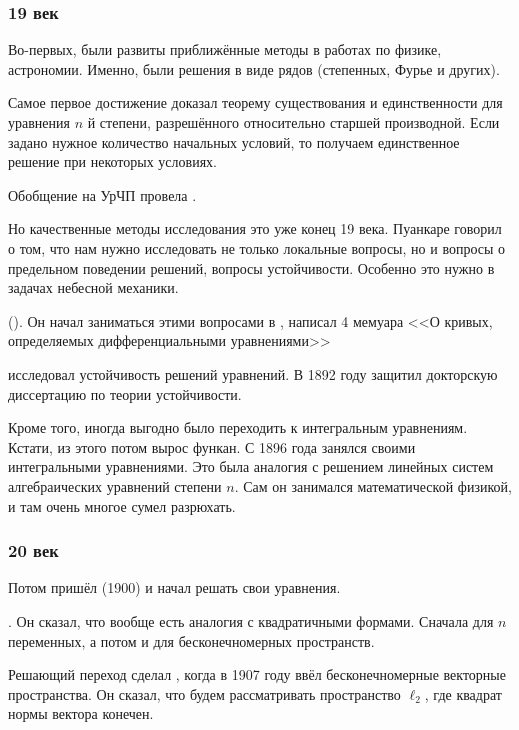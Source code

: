 \documentclass[a4paper,oneside,fleqn,10pt]{article}
\begin{document}
\subsubsection{19 век}

Во-первых, были развиты приближённые методы в работах по физике,
астрономии.  Именно, были решения в виде рядов (степенных, Фурье и
других).

Самое первое достижение  доказал теорему существования и
единственности для уравнения $n$ й степени, разрешённого относительно
старшей производной.  Если задано нужное количество начальных условий,
то получаем единственное решение при некоторых условиях.

Обобщение на УрЧП провела .

Но качественные методы исследования это уже конец 19 века.  Пуанкаре
говорил о том, что нам нужно исследовать не только локальные вопросы,
но и вопросы о предельном поведении решений, вопросы устойчивости.
Особенно это нужно в задачах небесной механики.

 (). Он начал заниматься этими вопросами
в , написал 4 мемуара <<О кривых, определяемых
дифференциальными уравнениями>>

  исследовал
устойчивость решений уравнений.  В 1892 году защитил докторскую
диссертацию по теории устойчивости.

Кроме того, иногда выгодно было переходить к интегральным уравнениям.
Кстати, из этого потом вырос функан. С 1896 года  занялся своими интегральными
уравнениями. Это была аналогия с решением линейных систем
алгебраических уравнений степени $n$. Сам он занимался математической
физикой, и там очень многое сумел разрюхать.

\subsubsection{20 век}

Потом пришёл  (1900) и начал решать свои уравнения.

 . Он сказал, что вообще есть аналогия с
квадратичными формами.  Сначала для $n$ переменных, а потом и для
бесконечномерных пространств.

Решающий переход сделал , когда в 1907 году ввёл
бесконечномерные векторные пространства.  Он сказал, что будем
рассматривать пространство $\ell_2$, где квадрат нормы вектора
конечен.
\end{document}
